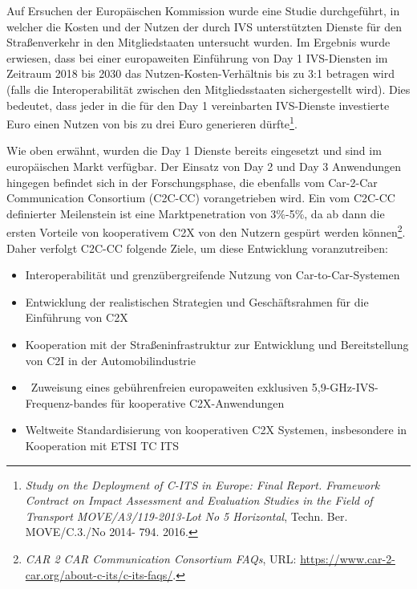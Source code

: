 
\nocite{Car2Car}

Auf Ersuchen der Europäischen Kommission wurde eine Studie durchgeführt, in welcher die Kosten und der Nutzen der durch IVS unterstützten Dienste für den Straßenverkehr in den Mitgliedstaaten untersucht wurden. Im Ergebnis wurde erwiesen, dass bei einer europaweiten Einführung von Day 1 IVS-Diensten im Zeitraum 2018 bis 2030 das Nutzen-Kosten-Verhältnis bis zu 3:1 betragen wird (falls die Interoperabilität zwischen den Mitgliedsstaaten sichergestellt wird). Dies bedeutet, dass jeder in die für den Day 1 vereinbarten IVS-Dienste investierte Euro einen Nutzen von bis zu drei Euro generieren dürfte\footnote{\emph{Study on the Deployment of C-ITS in Europe: Final Report. Framework Contract on Impact Assessment and Evaluation Studies in the Field of Transport MOVE/A3/119-2013-Lot No 5 Horizontal}, Techn. Ber. MOVE/C.3./No 2014- 794. 2016.}. \nocite{StudyDeployment} 

Wie oben erwähnt, wurden die Day 1 Dienste bereits eingesetzt und sind im europäischen Markt verfügbar. Der Einsatz von Day 2 und Day 3 Anwendungen hingegen befindet sich in der Forschungsphase, die ebenfalls vom Car-2-Car Communication Consortium (C2C-CC) vorangetrieben wird. Ein vom C2C-CC definierter Meilenstein ist eine Marktpenetration von 3\%-5\%, da ab dann die ersten Vorteile von kooperativem C2X von den Nutzern gespürt werden können\footnote{\emph{CAR 2 CAR Communication Consortium FAQs}, URL: \url{https://www.car-2-car.org/about-c-its/c-its-faqs/}.}\nocite{Car2Car}. Daher verfolgt C2C-CC folgende Ziele, um diese Entwicklung voranzutreiben:

\begin{itemize}
	\item Interoperabilität und grenzübergreifende Nutzung von Car-to-Car-Systemen
	\item Entwicklung der realistischen Strategien und Geschäftsrahmen für die Einführung von C2X
	\item Kooperation mit der Straßeninfrastruktur zur Entwicklung und Bereitstellung von C2I in der Automobilindustrie
	\item  Zuweisung eines gebührenfreien europaweiten exklusiven 5,9-GHz-IVS-Frequenz-bandes für kooperative C2X-Anwendungen
	\item Weltweite Standardisierung von kooperativen C2X Systemen, insbesondere in Kooperation mit ETSI TC ITS
\end{itemize}

